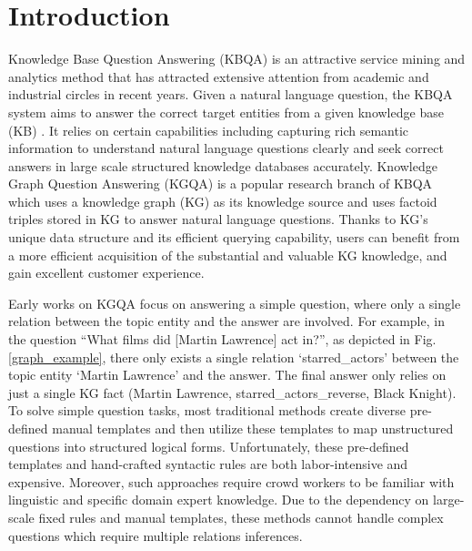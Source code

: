 \documentclass[pdflatex,sn-mathphys]{sn-jnl}%
\theoremstyle{thmstyleone}%
\theoremstyle{thmstyletwo}%
\theoremstyle{thmstylethree}%
\begin{document}
\section{Introduction}
\label{introduction}
Knowledge Base Question Answering (KBQA) \cite{xiaojin2019chatrobot} is an attractive service mining and analytics method that has attracted extensive attention from academic and industrial circles in recent years. Given a natural language question, the KBQA system aims to answer the correct target entities from a given knowledge base (KB) \cite{fu2020surveyQA}. It relies on certain capabilities including capturing rich semantic information to understand natural language questions clearly and seek correct answers in large scale structured knowledge databases accurately.  Knowledge Graph Question Answering (KGQA) \cite{hao2017endQA,michael2018SimpleQ} is a popular research branch of KBQA which uses a knowledge graph (KG) as its knowledge source \cite{fu2020surveyQA,yunshilan2021surveyQA} and uses factoid triples stored in KG to answer natural language questions. Thanks to KG's unique data structure and its efficient querying capability, users can benefit from a more efficient acquisition of the substantial and valuable KG knowledge, and gain excellent customer experience.

Early works \cite{yunshilan2019aQA,yunshilan2019bQA} on KGQA focus on answering a simple question, where only a single relation between the topic entity and the answer are involved. For example, in the question ``What films did [Martin Lawrence] act in?'', as depicted in Fig.\ref{graph_example}, there only exists a single relation `starred\_actors' between the topic entity `Martin Lawrence' and the answer. The final answer only relies on just a single KG fact (Martin Lawrence, starred\_actors\_reverse, Black Knight). To solve simple question tasks, most traditional methods \cite{bast2015fbQA,abujabal2017atgKGQA} create diverse pre-defined manual templates and then utilize these templates to map unstructured questions into structured logical forms. Unfortunately, these pre-defined templates and hand-crafted syntactic rules are both labor-intensive and expensive. Moreover, such approaches require crowd workers to be familiar with linguistic and specific domain expert knowledge. Due to the dependency on large-scale fixed rules and manual templates, these methods cannot handle complex questions which require multiple relations inferences.
\end{document}
